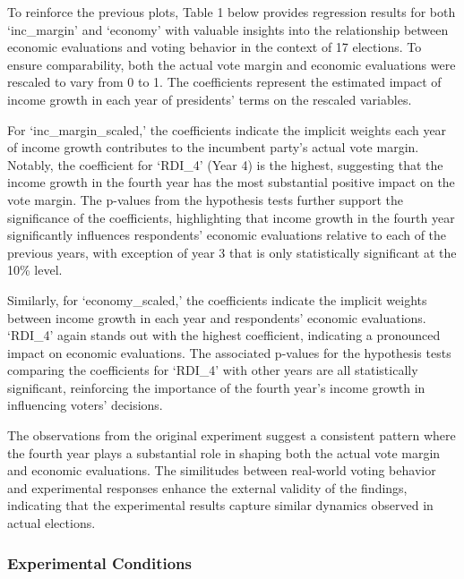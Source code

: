 \documentclass[
]{article}
\begin{document}
To reinforce the previous plots, Table 1 below provides regression
results for both `inc\_margin' and `economy' with valuable insights into
the relationship between economic evaluations and voting behavior in the
context of 17 elections. To ensure comparability, both the actual vote
margin and economic evaluations were rescaled to vary from 0 to 1. The
coefficients represent the estimated impact of income growth in each
year of presidents' terms on the rescaled variables.

For `inc\_margin\_scaled,' the coefficients indicate the implicit
weights each year of income growth contributes to the incumbent party's
actual vote margin. Notably, the coefficient for `RDI\_4' (Year 4) is
the highest, suggesting that the income growth in the fourth year has
the most substantial positive impact on the vote margin. The p-values
from the hypothesis tests further support the significance of the
coefficients, highlighting that income growth in the fourth year
significantly influences respondents' economic evaluations relative to
each of the previous years, with exception of year 3 that is only
statistically significant at the 10\% level.

Similarly, for `economy\_scaled,' the coefficients indicate the implicit
weights between income growth in each year and respondents' economic
evaluations. `RDI\_4' again stands out with the highest coefficient,
indicating a pronounced impact on economic evaluations. The associated
p-values for the hypothesis tests comparing the coefficients for
`RDI\_4' with other years are all statistically significant, reinforcing
the importance of the fourth year's income growth in influencing voters'
decisions.

\begin{center}
  
\end{center}

The observations from the original experiment suggest a consistent
pattern where the fourth year plays a substantial role in shaping both
the actual vote margin and economic evaluations. The similitudes between
real-world voting behavior and experimental responses enhance the
external validity of the findings, indicating that the experimental
results capture similar dynamics observed in actual elections.

\hypertarget{experimental-conditions}{%
\subsubsection{Experimental Conditions}\label{experimental-conditions}}
\end{document}
